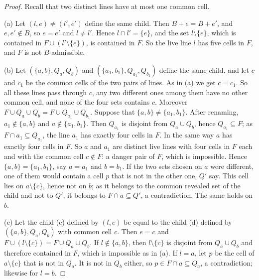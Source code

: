 \begin{proof}
Recall that two distinct lines have at most one common cell.

(a) Let $(l,e)\ne(l',e')$ define the same child. Then $B+e=B+e'$, and $e,e'\notin B$, so $e=e'$ and
$l\ne l'$. Hence $l\cap l'=\{e\}$, and the set $l\setminus\{e\}$, which is contained in
$F\cup(l'\setminus\{e\})$, is contained in $F$. So the live line $l$ has five cells in $F$, and $F$ is not
$B$-admissible.

(b) Let $(\{a,b\},Q_a,Q_b)$ and $(\{a_1,b_1\},Q_{a_1},Q_{b_1})$ define the same child, and let $c$ and $c_1$
be the common cells of the two pairs of lines. As in (a) we get $c=c_1$. So all these lines pass through
$c$, any two different ones among them have no other common cell, and none of the four sets contains $c$.
Moreover $F\cup Q_a\cup Q_b=F\cup Q_{a_1}\cup Q_{b_1}$. Suppose that $\{a,b\}\ne\{a_1,b_1\}$. After renaming,
$a_1\notin\{a,b\}$ and $a\notin\{a_1,b_1\}$. Then $Q_{a_1}$ is disjoint from $Q_a\cup Q_b$, hence
$Q_{a_1}\subseteq F$; as $F\cap a_1\subseteq Q_{a_1}$, the line $a_1$ has exactly four cells in $F$. In the same
way $a$ has exactly four cells in $F$. So $a$ and $a_1$ are distinct live lines with four cells in $F$ each
and with the common cell $c\notin F$: a danger pair of $F$, which is impossible. Hence
$\{a,b\}=\{a_1,b_1\}$, say $a=a_1$ and $b=b_1$. If the two sets chosen on $a$ were different, one of them
would contain a cell $p$ that is not in the other one, $Q'$ say. This cell lies on $a\setminus\{c\}$, hence
not on $b$; as it belongs to the common revealed set of the child and not to $Q'$, it belongs to
$F\cap a\subseteq Q'$, a contradiction. The same holds on $b$.

(c) Let the child \textup{(c)} defined by $(l,e)$ be equal to the child \textup{(d)} defined by
$(\{a,b\},Q_a,Q_b)$ with common cell $c$. Then $e=c$ and $F\cup(l\setminus\{c\})=F\cup Q_a\cup Q_b$. If
$l\notin\{a,b\}$, then $l\setminus\{c\}$ is disjoint from $Q_a\cup Q_b$ and therefore contained in $F$, which
is impossible as in (a). If $l=a$, let $p$ be the cell of $a\setminus\{c\}$ that is not in $Q_a$. It is not in
$Q_b$ either, so $p\in F\cap a\subseteq Q_a$, a contradiction; likewise for $l=b$.
\end{proof}

